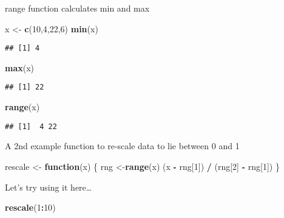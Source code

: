 \documentclass[]{article}
\newenvironment{Shaded}{\begin{snugshade}}{\end{snugshade}}
\newcommand{\ControlFlowTok}[1]{\textcolor[rgb]{0.13,0.29,0.53}{\textbf{#1}}}
\newcommand{\DecValTok}[1]{\textcolor[rgb]{0.00,0.00,0.81}{#1}}
\newcommand{\KeywordTok}[1]{\textcolor[rgb]{0.13,0.29,0.53}{\textbf{#1}}}
\newcommand{\NormalTok}[1]{#1}
\newcommand{\OperatorTok}[1]{\textcolor[rgb]{0.81,0.36,0.00}{\textbf{#1}}}
\newcommand{\StringTok}[1]{\textcolor[rgb]{0.31,0.60,0.02}{#1}}
\begin{document}
range function calculates min and max

\begin{Shaded}
\begin{Highlighting}[]
\NormalTok{x <-}\StringTok{ }\KeywordTok{c}\NormalTok{(}\DecValTok{10}\NormalTok{,}\DecValTok{4}\NormalTok{,}\DecValTok{22}\NormalTok{,}\DecValTok{6}\NormalTok{)}
\KeywordTok{min}\NormalTok{(x)}
\end{Highlighting}
\end{Shaded}

\begin{verbatim}
## [1] 4
\end{verbatim}

\begin{Shaded}
\begin{Highlighting}[]
\KeywordTok{max}\NormalTok{(x)}
\end{Highlighting}
\end{Shaded}

\begin{verbatim}
## [1] 22
\end{verbatim}

\begin{Shaded}
\begin{Highlighting}[]
\KeywordTok{range}\NormalTok{(x)}
\end{Highlighting}
\end{Shaded}

\begin{verbatim}
## [1]  4 22
\end{verbatim}

A 2nd example function to re-scale data to lie between 0 and 1

\begin{Shaded}
\begin{Highlighting}[]
\NormalTok{rescale <-}\StringTok{ }\ControlFlowTok{function}\NormalTok{(x) \{}
\NormalTok{ rng <-}\KeywordTok{range}\NormalTok{(x)}
\NormalTok{ (x }\OperatorTok{-}\StringTok{ }\NormalTok{rng[}\DecValTok{1}\NormalTok{]) }\OperatorTok{/}\StringTok{ }\NormalTok{(rng[}\DecValTok{2}\NormalTok{] }\OperatorTok{-}\StringTok{ }\NormalTok{rng[}\DecValTok{1}\NormalTok{])}
\NormalTok{\}}
\end{Highlighting}
\end{Shaded}

Let's try using it here\ldots{}

\begin{Shaded}
\begin{Highlighting}[]
\KeywordTok{rescale}\NormalTok{(}\DecValTok{1}\OperatorTok{:}\DecValTok{10}\NormalTok{)}
\end{Highlighting}
\end{Shaded}
\end{document}
